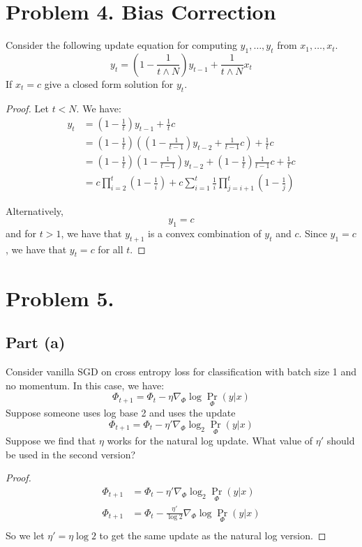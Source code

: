 \documentclass{amsart}
\theoremstyle{definition}
\begin{document}
\section*{Problem 4. Bias Correction}
Consider the following update equation for computing $y_1, \ldots, y_t$ from $x_1, \ldots, x_t$.
\[
y_t = \left(
    1 - \frac1{
        t \land N
    }
\right) y_{t - 1} + \frac1{
    t \land N
} x_t
\]
If $x_t = c$ give a closed form solution for $y_t$. 

\begin{proof}
    Let $t < N$. We have:
    \begin{align*}
        y_{t} &= \left(1 - \frac{1}{t}\right) y_{t - 1} + \frac{1}{t} c \\
        &= \left(1 - \frac{1}{t}\right) \left( \left(1 - \frac{1}{t - 1}\right) y_{t - 2} + \frac{1}{t - 1} c\right) + \frac{1}{t} c \\
        &= \left(1 - \frac{1}{t}\right) \left(1 - \frac{1}{t - 1}\right) y_{t - 2} + \left(1 - \frac{1}{t}\right) \frac{1}{t - 1} c + \frac{1}{t} c \\
        &= c\prod_{i = 2}^{t} \left(1 - \frac1{i}\right) +  c \sum_{i = 1}^t \frac1{i} \prod_{j = i + 1}^t \left(1 - \frac1{j}\right) 
    \end{align*}

    Alternatively, 
    \[
    y_1 = c
    \]
    and for $t > 1$, we have that $y_{t+1}$ is a convex combination of $y_t$ and $c$. Since $y_1 = c$, we have that $y_t = c$ for all $t$.
\end{proof}

\section*{Problem 5.}

\subsection*{Part (a)} Consider vanilla SGD on cross entropy loss for classification with batch size 1 and no momentum. In this case, we have:
\[
\Phi_{t + 1} = \Phi_t - \eta \nabla_{\Phi} \log \Pr_\Phi{(y | x)}
\]
Suppose someone uses log base 2 and uses the update 
\[
\Phi_{t + 1} = \Phi_t - \eta' \nabla_{\Phi} \log_2 \Pr_\Phi{(y | x)}
\]
Suppose we find that $\eta$ works for the natural log update. What value of $\eta'$ should be used in the second version?

\begin{proof}
    \begin{align*}
        \Phi_{t + 1} &= \Phi_t - \eta' \nabla_{\Phi} \log_2 \Pr_\Phi{(y | x)}\\ 
        \Phi_{t + 1} &= \Phi_t - \frac{\eta'}{\log{2}} \nabla_{\Phi} \log \Pr_\Phi{(y | x)}\\ 
    \end{align*}
    So we let $\eta' = \eta \log{2}$ to get the same update as the natural log version.
\end{proof}
\end{document}
